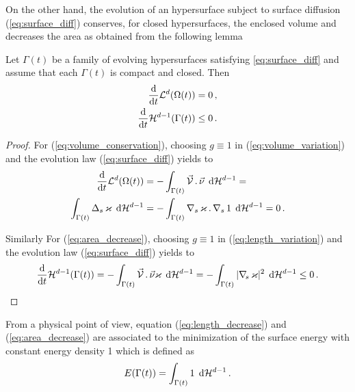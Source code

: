 On the other hand, the evolution of an hypersurface subject to surface
diffusion (\ref{eq:surface_diff}) conserves, for closed hypersurfaces, the
enclosed volume and decreases the area as obtained from the following
lemma

\begin{lemma}
Let $\Gamma(t)$ be a family of evolving hypersurfaces
satisfying \eqref{eq:surface_diff} and assume that each $\Gamma(t)$ is
compact and closed. Then
\begin{align}
\frac{\rm d}{{\rm d}t} \mathcal{L}^d(\Omega(t)) & = 0 \,, \label{eq:volume_conservation} \\
\frac{\rm d}{{\rm d}t} \mathcal{H}^{d-1} (\Gamma(t)) & \leq 0 \,.\label{eq:area_decrease}
\end{align}
\end{lemma}

\begin{proof}
For (\ref{eq:volume_conservation}), choosing $g \equiv 1$ in
(\ref{eq:volume_variation}) and the evolution law (\ref{eq:surface_diff}) yields
to
\begin{align*}
\frac{\rm d}{{\rm d}t} \mathcal{L}^d(\Omega(t)) &= - \int_{\Gamma(t)} \vec{\mathcal{V}}\,.\,\vec\nu \,
\;{\rm d}{\cal H}^{d-1} = \nonumber \\
\int_{\Gamma(t)} \Delta_s \, \varkappa \, \;{\rm d}{\cal H}^{d-1} &= - \int_{\Gamma(t)}
\nabla_s \, \varkappa \,.\, \nabla_s \, 1 \, \;{\rm d}{\cal H}^{d-1}= 0 \,.
\end{align*}

Similarly For (\ref{eq:area_decrease}), choosing $g \equiv 1$ in
(\ref{eq:length_variation}) and the evolution law (\ref{eq:surface_diff}) yields
to
\begin{equation*}
\frac{\rm d}{{\rm d}t} \mathcal{H}^{d-1}(\Gamma(t)) = - \int_{\Gamma(t)} \vec{\mathcal{V}}\,.\,\vec\nu
\varkappa \, \;{\rm d}{\cal H}^{d-1} = - \int_{\Gamma(t)} |\nabla_{\!s} \, \varkappa|^2 \, \;{\rm d}{\cal H}^{d-1}
\leq 0 \,.
\end{equation*}
\end{proof}

From a physical point of view, equation (\ref{eq:length_decrease}) and
(\ref{eq:area_decrease}) are associated to the minimization of the surface
energy with constant energy density 1 which is defined as
\begin{equation}\label{eq:surface_energy}
E(\Gamma(t)) = \int_{\Gamma(t)} 1 \, \;{\rm d}{\cal H}^{d-1} \, .
\end{equation}

